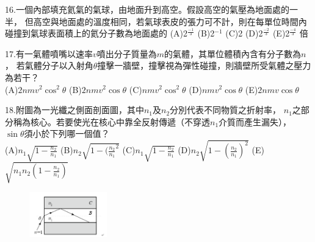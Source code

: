 \documentclass[cn,10pt,math=newtx]{elegantbook}
\begin{document}
\begin{example}
  16.一個內部填充氦氣的氣球，由地面升到高空。假設高空的氣壓為地面處的一半，
  但高空與地面處的溫度相同，若氣球表皮的張力可不計，則在每單位時間內碰撞到氣球表面積上的氦分子數為地面處的
(A)2$^{\frac{-1}{3}}$ (B)2$^{-1}$ (C)2 (D)2$^\frac{-2}{3}$ (E)2$^\frac{-4}{3}$ 倍
  \\
    \rightline{[成德高中教甄109]}
\end{example}
\begin{solution}
    
\end{solution}

\newpage

\begin{example}
   17.有一氣體噴嘴以速率$v$噴出分子質量為$m$的氣體，其單位體積內含有分子數為$n$，
   若氣體分子以入射角$\theta$撞擊一牆壁，撞擊視為彈性碰撞，則牆壁所受氣體之壓力為若干？\\
   (A)$2nmv^2 \cos^2{\theta}$ (B)$2nmv^2 \cos{\theta}$ (C)$nmv^2 \cos^2{\theta}$ 
   (D)$nmv^2 \cos{\theta}$ (E)$2nmv \cos{\theta}$
   \\
    \rightline{[成德高中教甄109]}
\end{example}
\begin{solution}
    
\end{solution}

\newpage

\begin{example}
   18.附圖為一光纖之側面剖面圖，其中$n_1$及$n_2$分別代表不同物質之折射率，
   $n_1$之部分稱為核心。若要使光在核心中靠全反射傳遞（不穿透$n_1$介質而產生漏失），
   $\sin{\theta}$須小於下列哪一個值？\\
   (A)$n_1 \sqrt{1-\frac{n_2}{n_1}}$ (B)$n_2 \sqrt{1-(\frac{n_2}{n_1}^2}$ 
   (C)$n_1 \sqrt{1-\frac{n_2}{n_1}}$ (D)$n_2 \sqrt{1-(\frac{n_2}{n_1})^2}$ 
   (E)$\sqrt{n_1 n_2(1-\frac{n_2}{n_1})}$
   \\
    \rightline{[成德高中教甄109]}
\end{example}
\begin{solution}
    
\end{solution}
\begin{figure}[htbp]
    \flushright
    \includegraphics[width=0.3\textwidth]{image/109成德18.png}
  \end{figure}
\newpage
\end{document}
